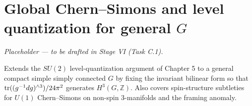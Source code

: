 \chapter{Global Chern--Simons and level quantization for general \texorpdfstring{$G$}{G}}\label{app:cs-level}

\emph{Placeholder --- to be drafted in Stage VI (Task C.1).}

Extends the $SU(2)$ level-quantization argument of Chapter 5 to a general compact simple simply connected $G$ by fixing the invariant bilinear form so that $\operatorname{tr}((g^{-1}dg)^{\wedge 3})/24\pi^2$ generates $H^3(G,\mathbb{Z})$. Also covers spin-structure subtleties for $U(1)$ Chern--Simons on non-spin 3-manifolds and the framing anomaly.
